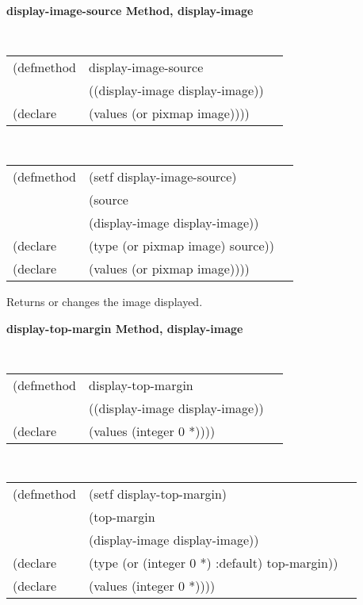 {\samepage  
{\large {\bf display-image-source \hfill Method, display-image}}
\begin{flushright} \parbox[t]{6.125in}{
\tt
\begin{tabular}{lll}
\raggedright
(defmethod & display-image-source & \\
& ((display-image  display-image))\\
(declare & (values (or pixmap image))))
\end{tabular}
\rm

}\end{flushright}}

\begin{flushright} \parbox[t]{6.125in}{
\tt
\begin{tabular}{lll}
\raggedright
(defmethod & (setf display-image-source) & \\
         & (source \\
         & (display-image  display-image)) \\
(declare &(type (or pixmap image)  source))\\
(declare & (values (or pixmap image))))
\end{tabular}
\rm}
\end{flushright}

\begin{flushright} \parbox[t]{6.125in}{
Returns or changes the image displayed. }
\end{flushright}



{\samepage  
{\large {\bf display-top-margin \hfill Method, display-image}}
\begin{flushright} \parbox[t]{6.125in}{
\tt
\begin{tabular}{lll}
\raggedright
(defmethod & display-top-margin & \\
& ((display-image  display-image)) \\
(declare & (values (integer 0 *))))
\end{tabular}
\rm

}\end{flushright}}

\begin{flushright} \parbox[t]{6.125in}{
\tt
\begin{tabular}{lll}
\raggedright
(defmethod & (setf display-top-margin) & \\
         & (top-margin \\
         & (display-image  display-image)) \\
(declare &(type (or (integer 0 *) :default)  top-margin))\\
(declare & (values (integer 0 *))))
\end{tabular}
\rm}
\end{flushright}

